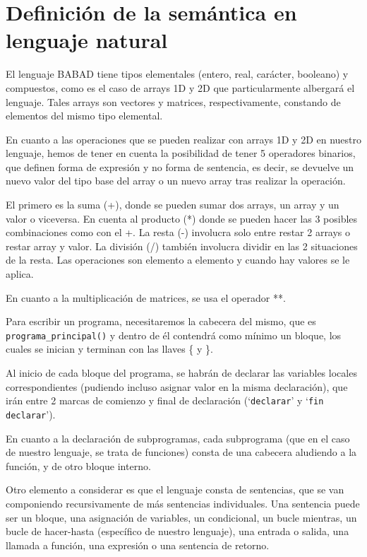 \section{Definición de la semántica en lenguaje natural}

El lenguaje BABAD tiene tipos elementales (entero, real, carácter, booleano) y compuestos, como es el caso de arrays 1D y 2D que particularmente albergará el lenguaje. Tales arrays son vectores y matrices, respectivamente, constando de elementos del mismo tipo elemental.

En cuanto a las operaciones que se pueden realizar con arrays 1D y 2D en nuestro lenguaje, hemos de tener en cuenta la posibilidad de tener 5 operadores binarios, que definen forma de expresión y no forma de sentencia, es decir, se devuelve un nuevo valor del tipo base del array o un nuevo array tras realizar la operación.

El primero es la suma (+), donde se pueden sumar dos arrays, un array y un valor o viceversa. En cuenta al producto (*) donde se pueden hacer las 3 posibles combinaciones como con el +. La resta (-) involucra solo entre restar 2 arrays o restar array y valor. La división (/) también involucra dividir en las 2 situaciones de la resta. Las operaciones son elemento a elemento y cuando hay valores se le aplica.

En cuanto a la multiplicación de matrices, se usa el operador **.

Para escribir un programa, necesitaremos la cabecera del mismo, que es \texttt{programa\_principal()} y dentro de él contendrá como mínimo un bloque, los cuales se inician y terminan con las llaves \{ y \}.

Al inicio de cada bloque del programa, se habrán de declarar las variables locales correspondientes (pudiendo incluso asignar valor en la misma declaración), que irán entre 2 marcas de comienzo y final de declaración (`\texttt{declarar}' y `\texttt{fin declarar}').

En cuanto a la declaración de subprogramas, cada subprograma (que en el caso  de nuestro lenguaje, se trata de funciones) consta de una cabecera aludiendo a la función, y de otro bloque interno.

Otro elemento a considerar es que el lenguaje consta de sentencias, que se van componiendo recursivamente de más sentencias individuales. Una sentencia puede ser un bloque, una asignación de variables, un condicional, un bucle mientras, un bucle de hacer-hasta (específico de nuestro lenguaje), una entrada o salida, una llamada a función, una expresión o una sentencia de retorno. 

